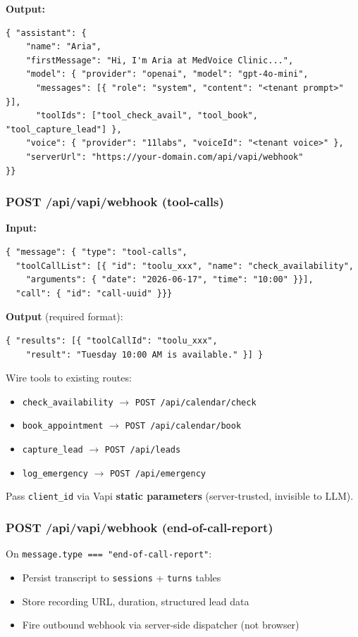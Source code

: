 \documentclass[11pt,a4paper]{article}
\begin{document}
\textbf{Output:}
\begin{verbatim}
{ "assistant": {
    "name": "Aria",
    "firstMessage": "Hi, I'm Aria at MedVoice Clinic...",
    "model": { "provider": "openai", "model": "gpt-4o-mini",
      "messages": [{ "role": "system", "content": "<tenant prompt>" }],
      "toolIds": ["tool_check_avail", "tool_book", "tool_capture_lead"] },
    "voice": { "provider": "11labs", "voiceId": "<tenant voice>" },
    "serverUrl": "https://your-domain.com/api/vapi/webhook"
}}
\end{verbatim}

\subsubsection{POST /api/vapi/webhook (tool-calls)}
\textbf{Input:}
\begin{verbatim}
{ "message": { "type": "tool-calls",
  "toolCallList": [{ "id": "toolu_xxx", "name": "check_availability",
    "arguments": { "date": "2026-06-17", "time": "10:00" }}],
  "call": { "id": "call-uuid" }}}
\end{verbatim}

\textbf{Output} (required format):
\begin{verbatim}
{ "results": [{ "toolCallId": "toolu_xxx",
    "result": "Tuesday 10:00 AM is available." }] }
\end{verbatim}

Wire tools to existing routes:
\begin{itemize}
  \item \texttt{check\_availability} $\rightarrow$ \texttt{POST /api/calendar/check}
  \item \texttt{book\_appointment} $\rightarrow$ \texttt{POST /api/calendar/book}
  \item \texttt{capture\_lead} $\rightarrow$ \texttt{POST /api/leads}
  \item \texttt{log\_emergency} $\rightarrow$ \texttt{POST /api/emergency}
\end{itemize}

Pass \texttt{client\_id} via Vapi \textbf{static parameters} (server-trusted, invisible to LLM).

\subsubsection{POST /api/vapi/webhook (end-of-call-report)}
On \texttt{message.type === "end-of-call-report"}:
\begin{itemize}
  \item Persist transcript to \texttt{sessions} + \texttt{turns} tables
  \item Store recording URL, duration, structured lead data
  \item Fire outbound webhook via server-side dispatcher (not browser)
\end{itemize}
\end{document}
